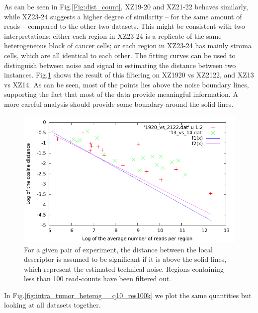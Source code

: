 \documentclass[11pt,a4paper]{article}
\begin{document}
As can be seen in Fig.\ref{Fig:dist_count}, XZ19-20 and XZ21-22 behaves similarly, while XZ23-24 suggests a higher degree of similarity -- for the same amount of reads -- compared to the other two datasets. This might be consistent with two interpretations: either each region in XZ23-24 is a replicate of the same heterogeneous block of cancer cells; or each region in XZ23-24 has mainly stroma cells, which are all identical to each other. The fitting curves can be used to distinguish between noise and signal in estimating the distance between two instances. Fig.\ref{Fig:filter_noise} shows the result of this filtering on XZ1920 vs XZ2122, and XZ13 vs XZ14. As can be seen, most of the points lies above the noise boundary lines, supporting the fact that most of the data provide meaningful information. A more careful analysis should provide some boundary around the solid lines.

\begin{figure}[hbtp]
\centering
\includegraphics[scale=1]{filter_noise.pdf}
\caption{For a given pair of experiment, the distance between the local descriptor is assumed to be significant if it is above the solid lines, which represent the estimated technical noise. Regions containing less than 100 read-counts have been filtered out.}
\label{Fig:filter_noise}
\end{figure}

In Fig.\ref{fig:intra_tumor_heterog__q10_res100k} we plot the same quantities but looking at all datasets together.
\end{document}
